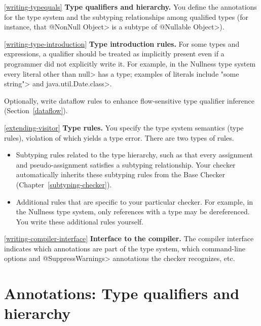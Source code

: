 \begin{description}

\item{\ref{writing-typequals}}
  \textbf{Type qualifiers and hierarchy.}  You define the annotations for
  the type system and the subtyping relationships among qualified types
  (for instance, that \<@NonNull Object> is a subtype of \<@Nullable
  Object>).

\item{\ref{writing-type-introduction}}
  \textbf{Type introduction rules.}  For some types and
  expressions, a qualifier should be treated as implicitly present even if a
  programmer did not explicitly write it.  For example, in the Nullness
  type system every literal
  other than \<null> has a  type;
  examples of literals include \<"some string"> and \<java.util.Date.class>.

  Optionally, write dataflow rules to enhance flow-sensitive type qualifier
  inference (Section~\ref{dataflow}).

\item{\ref{extending-visitor}}
  \textbf{Type rules.}  You specify the type system semantics (type
  rules), violation of which yields a type error.  There are two types of
  rules.
\begin{itemize}
\item
  Subtyping rules related to the type hierarchy, such as that every
  assignment and pseudo-assignment satisfies a subtyping relationship.
  Your checker automatically inherits these subtyping rules from the Base
  Checker (Chapter~\ref{subtyping-checker}).
\item
  Additional rules that are specific to your particular checker.  For
  example, in the Nullness type system, only references with a
   type may be dereferenced.  You
  write these additional rules yourself.
\end{itemize}

\item{\ref{writing-compiler-interface}}
  \textbf{Interface to the compiler.}  The compiler interface indicates
  which annotations are part of the type system, which command-line options
  and \<@SuppressWarnings> annotations the checker recognizes, etc.
\end{description}


\section{Annotations: Type qualifiers and hierarchy\label{writing-typequals}}

